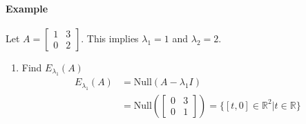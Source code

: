 \paragraph*{Example}
Let $A = \begin{bmatrix}
    1 & 3 \\
    0 & 2
\end{bmatrix}$. This implies $\lambda_1 = 1$ and $\lambda_2 = 2$.
    \begin{enumerate}
        \item Find $E_{\lambda_1}(A)$
        \begin{align*}
        E_{\lambda_1}(A) &= \text{Null}(A - \lambda_1 I) \\
        &= \text{Null}\left(\begin{bmatrix}
        0 & 3 \\
        0 & 1
    \end{bmatrix} \right) = \{[t, 0] \in \mathbb{R}^2 | t \in \mathbb{R}\}
    \end{align*}
\end{enumerate}
